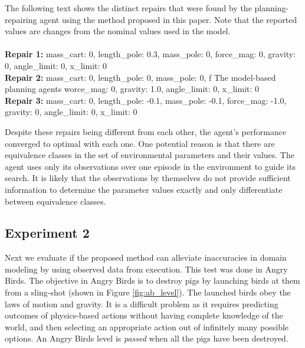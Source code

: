 \documentclass[letterpaper]{article} %
\newenvironment{console}{\ttfamily}{\par}
\begin{document}
The following text shows the distinct repairs that were found by the planning-repairing agent using the method proposed in this paper. Note that the reported values are changes from the nominal values used in the model. \\
\\
\begin{console}
\small
     \textbf{Repair 1:} {mass\_cart: 0, length\_pole: 0.3, mass\_pole: 0, force\_mag: 0, gravity: 0, angle\_limit: 0, x\_limit: 0} \\
    \textbf{Repair 2:} {mass\_cart: 0, length\_pole: 0, mass\_pole: 0, f
The model-based planning agents worce\_mag: 0, gravity: 1.0, angle\_limit: 0, x\_limit: 0}
    \\
    \textbf{Repair 3:} {mass\_cart: 0, length\_pole: -0.1, mass\_pole: -0.1, force\_mag: -1.0, gravity: 0, angle\_limit: 0, x\_limit: 0}
\end{console}
\smallskip
Despite these repairs being different from each other, the agent's performance converged to optimal with each one. One potential reason is that there are equivalence classes in the set of environmental parameters and their values. The agent uses only its observations over one episode in the environment to guide its search. It is likely that the observations by themselves do not provide sufficient information to determine the parameter values exactly and only differentiate between equivalence classes.

\subsection{Experiment 2}
Next we evaluate if the proposed method can alleviate inaccuracies in domain modeling by using observed data from execution. This test was done in Angry Birds. The objective in Angry Birds is to destroy pigs by launching birds at them from a sling-shot (shown in Figure \ref{fig:ab_level}). The launched birds obey the laws of motion and gravity. It is a difficult problem as it requires predicting outcomes of physics-based actions without having complete knowledge of the world, and then selecting an appropriate action out of infinitely many possible options. An Angry Birds level is \emph{passed} when all the pigs have been destroyed.
\end{document}

